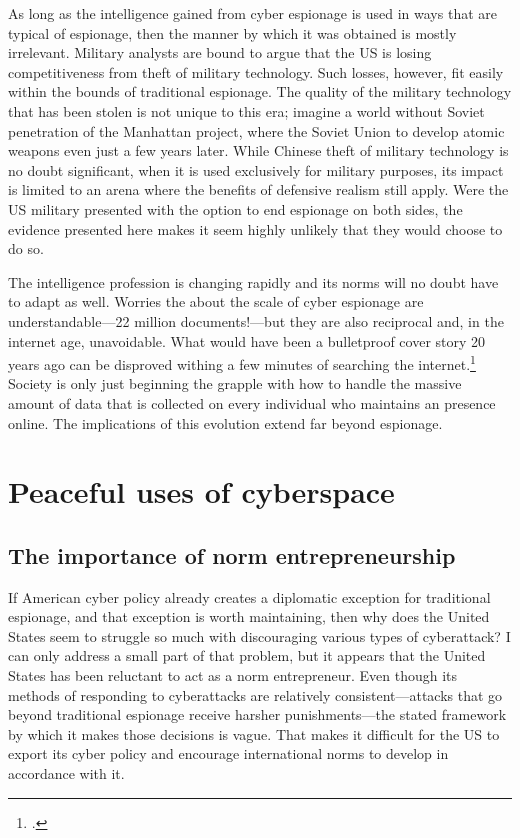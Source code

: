 \documentclass[11pt]{memoir}
\begin{document}
As long as the intelligence gained from cyber espionage is used in ways that are typical of espionage, then the manner by which it was obtained is mostly irrelevant. Military analysts are bound to argue that the US is losing competitiveness from theft of military technology. Such losses, however, fit easily within the bounds of traditional espionage. The quality of the military technology that has been stolen is not unique to this era; imagine a world without Soviet penetration of the Manhattan project, where the Soviet Union to develop atomic weapons even just a few years later. While Chinese theft of military technology is no doubt significant, when it is used exclusively for military purposes, its impact is limited to an arena where the benefits of defensive realism still apply. Were the US military presented with the option to end espionage on both sides, the evidence presented here makes it seem highly unlikely that they would choose to do so.

The intelligence profession is changing rapidly and its norms will no doubt have to adapt as well. Worries the about the scale of cyber espionage are understandable---22 million documents!---but they are also reciprocal and, in the internet age, unavoidable. What would have been a bulletproof cover story 20 years ago can be disproved withing a few minutes of searching the internet.\footcite{lucas_spycraft_2019} Society is only just beginning the grapple with how to handle the massive amount of data that is collected on every individual who maintains an presence online. The implications of this evolution extend far beyond espionage.

\section{Peaceful uses of cyberspace}
\subsection{The importance of norm entrepreneurship}
If American cyber policy already creates a diplomatic exception for traditional espionage, and that exception is worth maintaining, then why does the United States seem to struggle so much with discouraging various types of cyberattack? I can only address a small part of that problem, but it appears that the United States has been reluctant to act as a norm entrepreneur. Even though its methods of responding to cyberattacks are relatively consistent---attacks that go beyond traditional espionage receive harsher punishments---the stated framework by which it makes those decisions is vague. That makes it difficult for the US to export its cyber policy and encourage international norms to develop in accordance with it.
\end{document}
